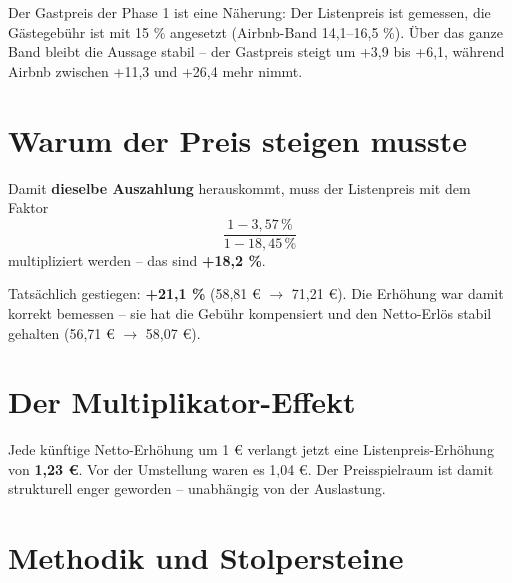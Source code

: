 \documentclass[11pt,a4paper]{article}
\begin{document}
Der Gastpreis der Phase 1 ist eine Näherung: Der Listenpreis ist gemessen, die
Gästegebühr ist mit 15 \% angesetzt (Airbnb-Band 14,1--16,5 \%). Über das ganze Band
bleibt die Aussage stabil – der Gastpreis steigt um +3,9 bis +6,1, während Airbnb
zwischen +11,3 und +26,4 mehr nimmt.

\section{Warum der Preis steigen musste}

Damit \textbf{dieselbe Auszahlung} herauskommt, muss der Listenpreis mit dem Faktor
\[
\frac{1 - 3{,}57\,\%}{1 - 18{,}45\,\%}
\]
multipliziert werden – das sind \textbf{+18,2 \%}.

Tatsächlich gestiegen: \textbf{+21,1 \%} (58,81 € $\rightarrow$ 71,21 €). Die Erhöhung war damit
korrekt bemessen – sie hat die Gebühr kompensiert und den Netto-Erlös stabil gehalten
(56,71 € $\rightarrow$ 58,07 €).

\section{Der Multiplikator-Effekt}

Jede künftige Netto-Erhöhung um 1 € verlangt jetzt eine Listenpreis-Erhöhung von
\textbf{1,23 €}. Vor der Umstellung waren es 1,04 €. Der Preisspielraum ist damit
strukturell enger geworden – unabhängig von der Auslastung.

\section{Methodik und Stolpersteine}
\end{document}
